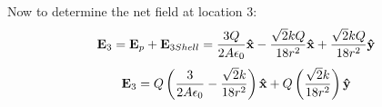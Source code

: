\documentclass{article}
\begin{document}
\begin{enumerate}[(a)]
    Now to determine the net field at location 3:
    \begin{equation*}
    \vb{E}_3 = \vb{E}_p + \vb{E}_{3Shell} = \frac{3Q}{2A\epsilon_0}\vu{x} - \frac{\sqrt{2}kQ}{18r^2}\vu{x} + \frac{\sqrt{2}kQ}{18r^2}\vu{y}
    \end{equation*}
    \begin{equation}
    \vb{E}_3 = Q\left(\frac{3}{2A\epsilon_0} - \frac{\sqrt{2}k}{18r^2}\right)\vu{x} + Q\left(\frac{\sqrt{2}k}{18r^2}\right)\vu{y}
    \end{equation}
\end{enumerate}
\end{document}
